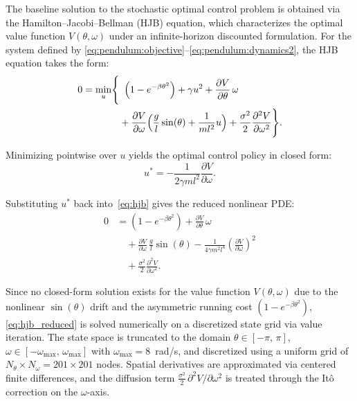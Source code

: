 The baseline solution to the stochastic optimal control problem is obtained via the Hamilton--Jacobi--Bellman (HJB) equation, which characterizes the optimal value function $V(\theta, \omega)$ under an infinite-horizon discounted formulation. For the system defined by \eqref{eq:pendulum:objective}--\eqref{eq:pendulum:dynamics2}, the HJB equation takes the form:
\begin{equation}
\begin{split}
    0 = \min_{u}\Biggl\{&\ \left(1 - e^{-\beta\theta^2}\right) + \gamma u^2
        + \frac{\partial V}{\partial \theta}\,\omega \\
        &+ \frac{\partial V}{\partial \omega}\Bigl(\frac{g}{l}\sin(\theta) + \frac{1}{m l^2}u\Bigr)
        + \frac{\sigma^2}{2}\frac{\partial^2 V}{\partial \omega^2}\Biggr\}.
    \label{eq:hjb}
\end{split}
\end{equation}

Minimizing pointwise over $u$ yields the optimal control policy in closed form:
\begin{equation}
    u^* = -\frac{1}{2\gamma m l^2}\frac{\partial V}{\partial \omega}.
    \label{eq:optimal_control}
\end{equation}

Substituting $u^*$ back into~\eqref{eq:hjb} gives the reduced nonlinear PDE:
\begin{equation}
\begin{split}
    0 &= \left(1 - e^{-\beta\theta^2}\right)
        + \frac{\partial V}{\partial \theta}\,\omega \\
    &\quad + \frac{\partial V}{\partial \omega}\,\frac{g}{l}\sin{\left(\theta\right)}
        - \frac{1}{4\gamma m^2 l^4}\left(\frac{\partial V}{\partial \omega}\right)^2 \\
    &\quad + \frac{\sigma^2}{2}\frac{\partial^2 V}{\partial \omega^2}.
    \label{eq:hjb_reduced}
\end{split}
\end{equation}

Since no closed-form solution exists for the value function $V(\theta, \omega)$ due to the nonlinear $\sin(\theta)$ drift and the asymmetric running cost $(1 - e^{-\beta\theta^2})$, \eqref{eq:hjb_reduced} is solved numerically on a discretized state grid via value iteration. The state space is truncated to the domain $\theta \in [-\pi,\,\pi]$, $\omega \in [-\omega_{\max},\,\omega_{\max}]$ with $\omega_{\max} = 8$~rad/s, and discretized using a uniform grid of $N_\theta \times N_\omega = 201 \times 201$ nodes. Spatial derivatives are approximated via centered finite differences, and the diffusion term $\frac{\sigma^2}{2}\,\partial^2 V/\partial\omega^2$ is treated through the It\^{o} correction on the $\omega$-axis.

